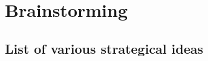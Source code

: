 \newpage
\section{Brainstorming}
\label{sec:Section00}

\subsection{List of various strategical ideas}
\label{sec:Section00.a-}